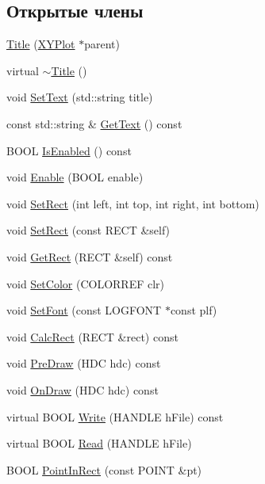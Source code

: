 \subsection*{Открытые члены}
\begin{DoxyCompactItemize}
\item 
\hyperlink{class_title_a4d068e3875d34aaaa124e85ff0a9c1b6}{Title} (\hyperlink{class_x_y_plot}{X\-Y\-Plot} $\ast$parent)
\item 
virtual \hyperlink{class_title_aa0423651e6010e406b1c1052724b785c}{$\sim$\-Title} ()
\item 
void \hyperlink{class_title_a88824ac75fe1cbca7f70a1462cbc25d9}{Set\-Text} (std\-::string title)
\item 
const std\-::string \& \hyperlink{class_title_a646532e094e688b9e73e5e951a93e048}{Get\-Text} () const 
\item 
B\-O\-O\-L \hyperlink{class_title_ac7bf776f04bb75cc6c66ba9cdab71c22}{Is\-Enabled} () const 
\item 
void \hyperlink{class_title_a31928993578740840b258a94b062eade}{Enable} (B\-O\-O\-L enable)
\item 
void \hyperlink{class_title_a95aee75f093e7eb85645a8d4dc802b06}{Set\-Rect} (int left, int top, int right, int bottom)
\item 
void \hyperlink{class_title_a0f457e200344c92e5d12d4d6199c888f}{Set\-Rect} (const R\-E\-C\-T \&self)
\item 
void \hyperlink{class_title_a9e5c75bae8151de72bb7d0d0c6d1c5f2}{Get\-Rect} (R\-E\-C\-T \&self) const 
\item 
void \hyperlink{class_title_a04553fad66a8fa3ebc25caa9feef4a72}{Set\-Color} (C\-O\-L\-O\-R\-R\-E\-F clr)
\item 
void \hyperlink{class_title_a6b9e9144570e2294a449cf6ad75e6049}{Set\-Font} (const L\-O\-G\-F\-O\-N\-T $\ast$const plf)
\item 
void \hyperlink{class_title_aeb566c4bd88a475d34e5c8ac0213a06d}{Calc\-Rect} (R\-E\-C\-T \&rect) const 
\item 
void \hyperlink{class_title_a893f26e58b8a74f797d877d3d6651761}{Pre\-Draw} (H\-D\-C hdc) const 
\item 
void \hyperlink{class_title_aa1d4bfc873fa5d1c1132cfbde2744cc7}{On\-Draw} (H\-D\-C hdc) const 
\item 
virtual B\-O\-O\-L \hyperlink{class_title_a3c42069773ac1c18a05ea891b39a3332}{Write} (H\-A\-N\-D\-L\-E h\-File) const 
\item 
virtual B\-O\-O\-L \hyperlink{class_title_ad1cfcfb17962c87f63cae0966d07998c}{Read} (H\-A\-N\-D\-L\-E h\-File)
\item 
B\-O\-O\-L \hyperlink{class_title_ade929e6ec3bdb452027efc7552518cea}{Point\-In\-Rect} (const P\-O\-I\-N\-T \&pt)
\end{DoxyCompactItemize}
